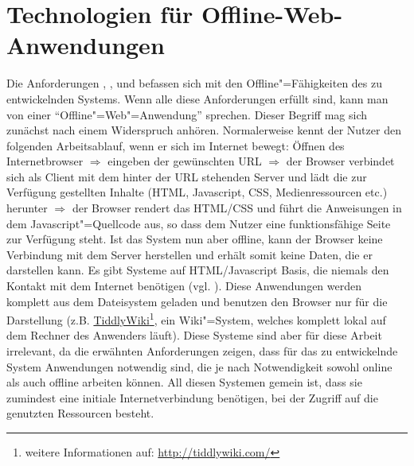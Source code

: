 \section{Technologien für Offline-Web-Anwendungen}
Die Anforderungen , ,  und  befassen sich mit den Offline"=Fähigkeiten des zu entwickelnden Systems. Wenn alle diese Anforderungen erfüllt sind, kann man von einer "`Offline"=Web"=Anwendung"' sprechen. Dieser Begriff mag sich zunächst nach einem Widerspruch anhören. Normalerweise kennt der Nutzer den folgenden Arbeitsablauf, wenn er sich im Internet bewegt: Öffnen des Internetbrowser $\Rightarrow$ eingeben der gewünschten \ac{URL} $\Rightarrow$ der Browser verbindet sich als Client mit dem hinter der \ac{URL} stehenden Server und lädt die zur Verfügung gestellten Inhalte (\ac{HTML}, Javascript, \ac{CSS}, Medienressourcen etc.) herunter $\Rightarrow$ der Browser rendert das \ac{HTML}/\ac{CSS} und führt die Anweisungen in dem Javascript"=Quellcode aus, so dass dem Nutzer eine funktionsfähige Seite zur Verfügung steht. Ist das System nun aber offline, kann der Browser keine Verbindung mit dem Server herstellen und erhält somit keine Daten, die er darstellen kann. Es gibt Systeme auf \ac{HTML}/Javascript Basis, die niemals den Kontakt mit dem Internet benötigen (vgl. \cite{Mahemoff22010}). Diese Anwendungen werden komplett aus dem Dateisystem geladen und benutzen den Browser nur für die Darstellung (z.B. \href{http://tiddlywiki.com}{TiddlyWiki}\footnote{weitere Informationen auf: \url{http://tiddlywiki.com/}}, ein Wiki"=System, welches komplett lokal auf dem Rechner des Anwenders läuft). Diese Systeme sind aber für diese Arbeit irrelevant, da die erwähnten Anforderungen zeigen, dass für das zu entwickelnde System Anwendungen notwendig sind, die je nach Notwendigkeit sowohl online als auch offline arbeiten können. All diesen Systemen gemein ist, dass sie zumindest eine initiale Internetverbindung benötigen, bei der Zugriff auf die genutzten Ressourcen besteht.

